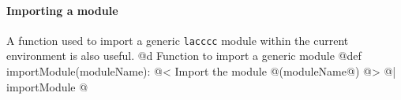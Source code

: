 \documentclass[11pt,oneside]{article}    %
\begin{document}
\paragraph{Importing a module} A function used to import a generic \texttt{lacccc} module within the current environment is also useful.
@d Function to import a generic module
@{def importModule(moduleName):
    @< Import the module @(moduleName@) @>
@| importModule @}





\end{document}
